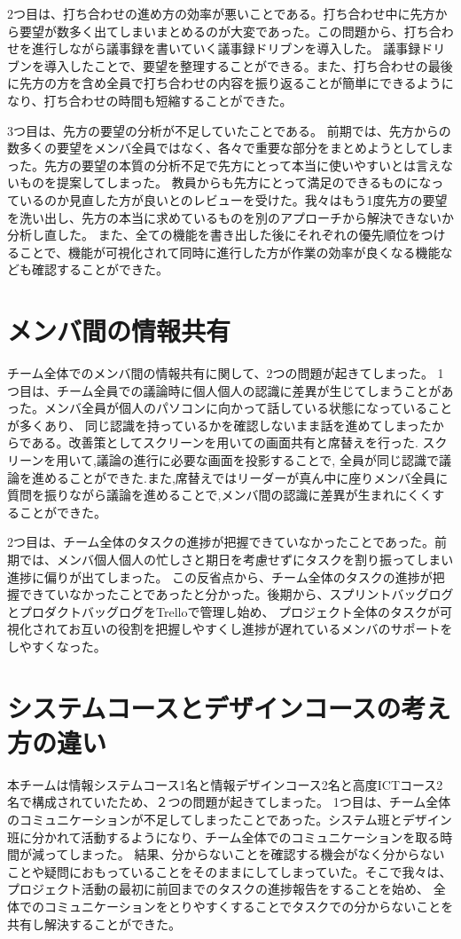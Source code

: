 2つ目は、打ち合わせの進め方の効率が悪いことである。打ち合わせ中に先方から要望が数多く出てしまいまとめるのが大変であった。この問題から、打ち合わせを進行しながら議事録を書いていく議事録ドリブンを導入した。
議事録ドリブンを導入したことで、要望を整理することができる。また、打ち合わせの最後に先方の方を含め全員で打ち合わせの内容を振り返ることが簡単にできるようになり、打ち合わせの時間も短縮することができた。

3つ目は、先方の要望の分析が不足していたことである。
前期では、先方からの数多くの要望をメンバ全員ではなく、各々で重要な部分をまとめようとしてしまった。先方の要望の本質の分析不足で先方にとって本当に使いやすいとは言えないものを提案してしまった。
教員からも先方にとって満足のできるものになっているのか見直した方が良いとのレビューを受けた。我々はもう1度先方の要望を洗い出し、先方の本当に求めているものを別のアプローチから解決できないか分析し直した。
また、全ての機能を書き出した後にそれぞれの優先順位をつけることで、機能が可視化されて同時に進行した方が作業の効率が良くなる機能なども確認することができた。
\section{メンバ間の情報共有}
チーム全体でのメンバ間の情報共有に関して、2つの問題が起きてしまった。
1つ目は、チーム全員での議論時に個人個人の認識に差異が生じてしまうことがあった。メンバ全員が個人のパソコンに向かって話している状態になっていることが多くあり、
同じ認識を持っているかを確認しないまま話を進めてしまったからである。改善策としてスクリーンを用いての画面共有と席替えを行った. スクリーンを用いて,議論の進行に必要な画面を投影することで,
全員が同じ認識で議論を進めることができた.また,席替えではリーダーが真ん中に座りメンバ全員に質問を振りながら議論を進めることで,メンバ間の認識に差異が生まれにくくすることができた。

2つ目は、チーム全体のタスクの進捗が把握できていなかったことであった。前期では、メンバ個人個人の忙しさと期日を考慮せずにタスクを割り振ってしまい進捗に偏りが出てしまった。
この反省点から、チーム全体のタスクの進捗が把握できていなかったことであったと分かった。後期から、スプリントバッグログとプロダクトバッグログをTrelloで管理し始め、
プロジェクト全体のタスクが可視化されてお互いの役割を把握しやすくし進捗が遅れているメンバのサポートをしやすくなった。

\section{システムコースとデザインコースの考え方の違い}
本チームは情報システムコース1名と情報デザインコース2名と高度ICTコース2名で構成されていたため、２つの問題が起きてしまった。
1つ目は、チーム全体のコミュニケーションが不足してしまったことであった。システム班とデザイン班に分かれて活動するようになり、チーム全体でのコミュニケーションを取る時間が減ってしまった。
結果、分からないことを確認する機会がなく分からないことや疑問におもっていることをそのままにしてしまっていた。そこで我々は、プロジェクト活動の最初に前回までのタスクの進捗報告をすることを始め、
全体でのコミュニケーションをとりやすくすることでタスクでの分からないことを共有し解決することができた。

